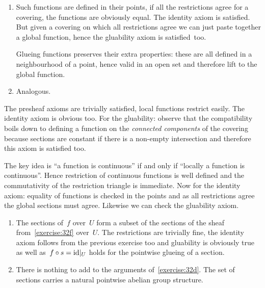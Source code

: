\begin{exercise}
  \begin{enumerate}
    \item Such functions are defined in their points, if all the restrictions agree for a covering, the functions are obviously equal. The identity axiom is satisfied. But given a covering on which all restrictions agree we can just paste together a global function, hence the gluability axiom is satisfied~too.

      Glueing functions preserves their extra properties: these are all defined in a neighbourhood of a point, hence valid in an open set and therefore lift to the global function.

    \item Analogous.
  \end{enumerate}
\end{exercise}

\begin{exercise}
  The presheaf axioms are trivially satisfied, local functions restrict easily. The identity axiom is obvious too. For the gluability: observe that the compatibility boils down to defining a function on the \emph{connected components} of the covering because sections are constant if there is a non-empty intersection and therefore this axiom is satisfied too.
\end{exercise}

\begin{exercise}
  \label{exercise:32f}
 The key idea is ``a function is continuous'' if and only if ``locally a function is continuous''. Hence restriction of continuous functions is well defined and the commutativity of the restriction triangle is immediate. Now for the identity axiom: equality of functions is checked in the points and as all restrictions agree the global sections must agree. Likewise we can check the gluability axiom.
\end{exercise}

\begin{exercise}
  \begin{enumerate}
    \item The sections of~$f$ over~$U$ form a subset of the sections of the sheaf from~\autoref{exercise:32f} over~$U$. The restrictions are trivially fine, the identity axiom follows from the previous exercise too and gluability is obviously true as well as~$f\circ s=\mathrm{id}|_U$ holds for the pointwise glueing of a section.

    \item There is nothing to add to the arguments of~\autoref{exercise:32d}. The set of sections carries a natural pointwise abelian group structure.
  \end{enumerate}
\end{exercise}

